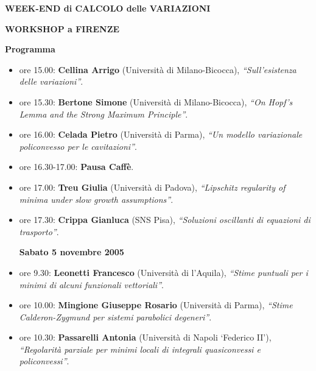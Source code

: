 \documentclass[12pt]{article}
\begin{document}
\centerline{\large{\bf{WEEK-END di CALCOLO delle VARIAZIONI}}}
\vspace*{0.035truein}
\centerline{\large{\bf WORKSHOP a FIRENZE}}
\vspace*{0.035truein}
\centerline{\small{\bf Programma}}
\vspace*{0.35truein}
%
%

\begin{itemize}

\centerline{\bf Venerd\`i 4 novembre 2005}

\item{ore 15.00: {\bf Cellina Arrigo} (Universit\`a di Milano-Bicocca),} 
\emph{``Sull'esistenza delle variazioni''}.

\item{ore 15.30: {\bf Bertone Simone} (Universit\`a di Milano-Bicocca),}
\emph{``On Hopf's Lemma and the Strong Maximum Principle''}.

\item{ore 16.00: {\bf Celada Pietro} (Universit\`a di Parma),} 
\emph{``Un modello variazionale policonvesso per le cavitazioni''}.

\item{ore 16.30-17.00: {\bf Pausa Caff\`e}.}

\item{ore 17.00: {\bf Treu Giulia} (Universit\`a di Padova),} 
\emph{``Lipschitz regularity of minima under slow growth assumptions''}.

\item{ore 17.30: {\bf Crippa Gianluca} (SNS Pisa),}
\emph{``Soluzioni oscillanti di equazioni di trasporto''}.


\vspace*{0.2truein}



\centerline{\bf Sabato 5 novembre 2005}



\item{ore 9.30: {\bf Leonetti Francesco} (Universit\`a di l'Aquila),}
\emph{``Stime puntuali per i minimi di alcuni funzionali vettoriali''}.

\item{ore 10.00: {\bf Mingione Giuseppe Rosario} (Universit\`a di Parma),}
\emph{``Stime Calderon-Zygmund per sistemi parabolici degeneri''}.

\item{ore 10.30: {\bf Passarelli Antonia} 
(Universit\`a di Napoli `Federico II'),}
\emph{``Regolarit\`a parziale per minimi locali di integrali 
quasiconvessi e policonvessi''}.



\end{itemize}
\end{document}
